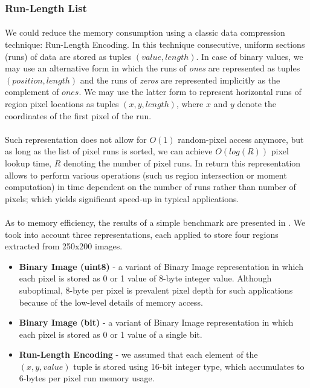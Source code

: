 \subsubsection{Run-Length List}

\paragraph*{}
We could reduce the memory consumption using a classic data compression technique: Run-Length Encoding. In this technique consecutive, uniform sections (runs) of data are stored as tuples $(value, length)$. In case of binary values, we may use an alternative form in which the runs of \textit{ones} are represented as tuples $(position, length)$ and the runs of \textit{zeros} are represented implicitly as the complement of $ones$. We may use the latter form to represent horizontal runs of region pixel locations as tuples $(x, y, length)$, where $x$ and $y$ denote the coordinates of the first pixel of the run. 

\paragraph*{}
Such representation does not allow for $O(1)$ random-pixel access anymore, but as long as the list of pixel runs is sorted, we can achieve $O(log(R))$ pixel lookup time, $R$ denoting the number of pixel runs. In return this representation allows to perform various operations (such us region intersection or moment computation) in time dependent on the number of runs rather than number of pixels; which yields significant speed-up in typical applications.

\paragraph*{}
As to memory efficiency, the results of a simple benchmark are presented in . We took into account three representations, each applied to store four regions extracted from 250x200 images.

\begin{itemize}
	\item \textbf{Binary Image (uint8)} - a variant of Binary Image representation in which each pixel is stored as 0 or 1 value of 8-byte integer value. Although suboptimal, 8-byte per pixel is prevalent pixel depth for such applications because of the low-level details of memory access.
	\item \textbf{Binary Image (bit)} - a variant of Binary Image representation in which each pixel is stored as 0 or 1 value of a single bit.
	\item \textbf{Run-Length Encoding} - we assumed that each element of the $(x, y, value)$ tuple is stored using 16-bit integer type, which accumulates to 6-bytes per pixel run memory usage.
\end{itemize}


